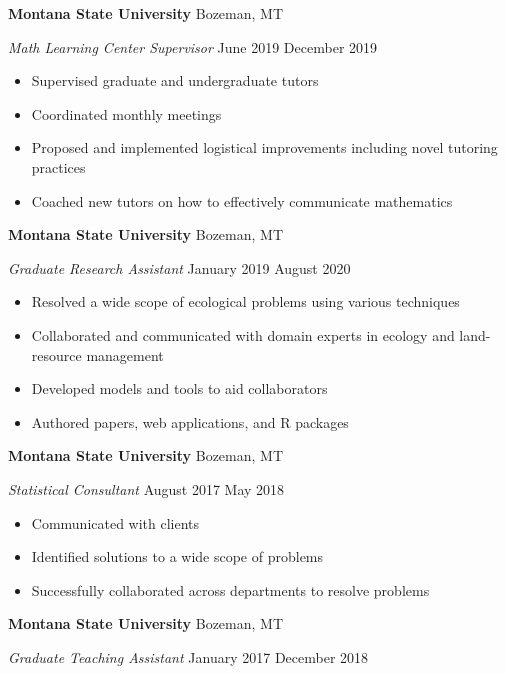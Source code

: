 \documentclass[a4paper]{article}
\begin{document}
\textbf{Montana State University} \hfill Bozeman, MT

\textit{Math Learning Center Supervisor} \hfill June 2019 \textbar{}
December 2019

\vspace{-1mm}
\begin{itemize} \itemsep 1pt
   \item Supervised graduate and undergraduate tutors
   \item Coordinated monthly meetings
   \item Proposed and implemented logistical improvements including novel tutoring practices
   \item Coached new tutors on how to effectively communicate mathematics
\end{itemize}

\textbf{Montana State University} \hfill Bozeman, MT

\textit{Graduate Research Assistant} \hfill January 2019 \textbar{}
August 2020

\vspace{-1mm}
\begin{itemize} \itemsep 1pt
   \item Resolved a wide scope of ecological problems using various techniques
   \item Collaborated and communicated with domain experts in ecology and land-resource management
   \item Developed models and tools to aid collaborators
   \item Authored papers, web applications, and R packages
\end{itemize}

\textbf{Montana State University} \hfill Bozeman, MT

\textit{Statistical Consultant} \hfill August 2017 \textbar{} May 2018

\vspace{-1mm}
\begin{itemize} \itemsep 1pt
   \item Communicated with clients
   \item Identified solutions to a wide scope of problems
   \item Successfully collaborated across departments to resolve problems
\end{itemize}

\textbf{Montana State University} \hfill Bozeman, MT

\textit{Graduate Teaching Assistant} \hfill January 2017 \textbar{}
December 2018
\end{document}
